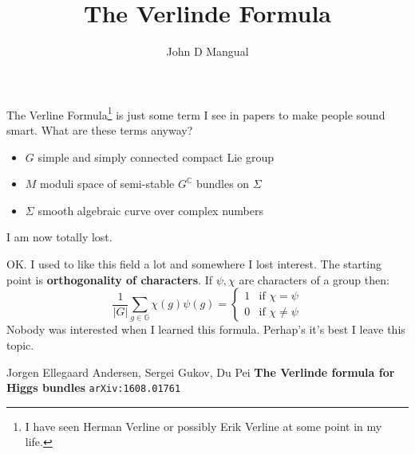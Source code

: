 \documentclass[12pt]{article}
\title{\textbf{ The Verlinde Formula }}
\author{John D Mangual}
\date{}
\begin{document}
\selectfont \fontsize{25}{30}\selectfont

\maketitle


\noindent The Verline Formula\footnote{I have seen Herman Verline or possibly Erik Verline at some point in my life.} is just some term I see in papers to make people sound smart.  What are these terms anyway?
\begin{itemize}
\item $G$ simple and simply connected compact Lie group
\item $M$ moduli space of semi-stable $G^\mathbb{C}$ bundles on $\Sigma$
\item $\Sigma$ smooth algebraic curve over complex numbers
\end{itemize}
I am now totally lost.  

\newpage

\noindent OK.  I used to like this field a lot and somewhere I lost interest.  The starting point is \textbf{orthogonality of characters}. If $\psi, \chi$ are characters of a group then:
$$ \frac{1}{|G|}\sum_{g \in \mathbb{G}} \chi(g) \psi(g) = \left\{ \begin{array}{cl} 1 & \text{if }\chi = \psi \\
0 &\text{if }\chi \neq \psi
\end{array} \right. $$
Nobody was interested when I learned this formula.  Perhap's it's best I leave this topic.

\newpage




\selectfont \fontsize{12}{10}\selectfont

\begin{thebibliography}{}

\item Jorgen Ellegaard Andersen, Sergei Gukov, Du Pei \textbf{The Verlinde formula for Higgs bundles} \texttt{arXiv:1608.01761
}




\end{thebibliography}
\end{document}
